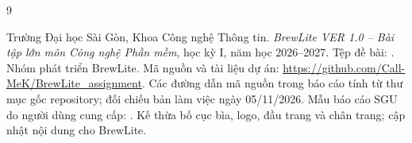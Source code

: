 \documentclass[12pt,a4paper]{article}
\begin{document}
\tableofcontents
\clearpage
{}

\clearpage

\clearpage

\clearpage


\clearpage
\begin{thebibliography}{9}
 Trường Đại học Sài Gòn, Khoa Công nghệ Thông tin.
\emph{BrewLite VER 1.0 -- Bài tập lớn môn Công nghệ Phần mềm}, học kỳ I,
năm học 2026--2027. Tệp đề bài: .
 Nhóm phát triển BrewLite. Mã nguồn và tài liệu dự án:
\url{https://github.com/Call-MeK/BrewLite_assignment}.
Các đường dẫn mã nguồn trong báo cáo tính từ thư mục gốc repository;
đối chiếu bản làm việc ngày 05/11/2026.
 Mẫu báo cáo SGU do người dùng cung cấp:
.
Kế thừa bố cục bìa, logo, đầu trang và chân trang; cập nhật nội dung cho BrewLite.
\end{thebibliography}
\end{document}
